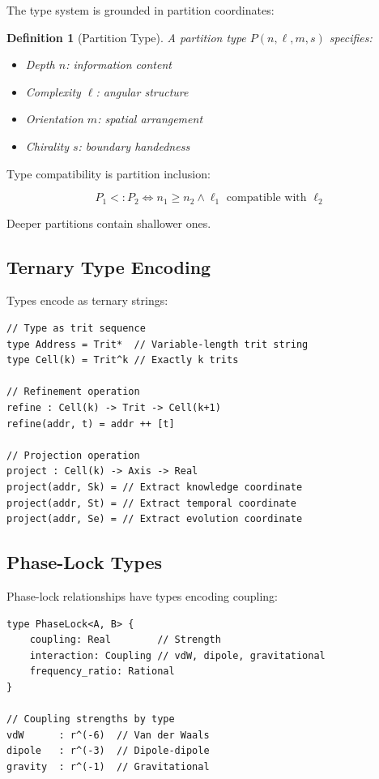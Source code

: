 \documentclass[twocolumn,10pt]{article}
\newtheorem{definition}[theorem]{Definition}
\theoremstyle{remark}
\begin{document}
The type system is grounded in partition coordinates:

\begin{definition}[Partition Type]
A partition type $P(n, \ell, m, s)$ specifies:
\begin{itemize}
    \item Depth $n$: information content
    \item Complexity $\ell$: angular structure
    \item Orientation $m$: spatial arrangement
    \item Chirality $s$: boundary handedness
\end{itemize}
\end{definition}

Type compatibility is partition inclusion:

\begin{equation}
P_1 <: P_2 \iff n_1 \geq n_2 \land \ell_1 \text{ compatible with } \ell_2
\end{equation}

Deeper partitions contain shallower ones.

\subsection{Ternary Type Encoding}

Types encode as ternary strings:

\begin{lstlisting}
// Type as trit sequence
type Address = Trit*  // Variable-length trit string
type Cell(k) = Trit^k // Exactly k trits

// Refinement operation
refine : Cell(k) -> Trit -> Cell(k+1)
refine(addr, t) = addr ++ [t]

// Projection operation
project : Cell(k) -> Axis -> Real
project(addr, Sk) = // Extract knowledge coordinate
project(addr, St) = // Extract temporal coordinate
project(addr, Se) = // Extract evolution coordinate
\end{lstlisting}

\subsection{Phase-Lock Types}

Phase-lock relationships have types encoding coupling:

\begin{lstlisting}
type PhaseLock<A, B> {
    coupling: Real        // Strength
    interaction: Coupling // vdW, dipole, gravitational
    frequency_ratio: Rational
}

// Coupling strengths by type
vdW      : r^(-6)  // Van der Waals
dipole   : r^(-3)  // Dipole-dipole
gravity  : r^(-1)  // Gravitational
\end{lstlisting}
\end{document}
